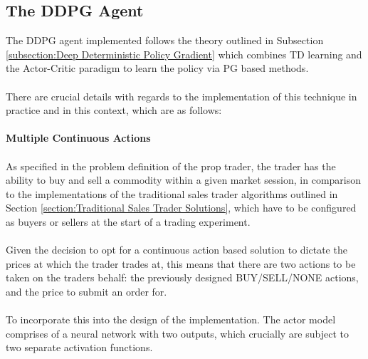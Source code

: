 \documentclass[ %
                    author={Ashwinder Khurana},
                supervisor={Prof Dave Cliff},
                    degree={MEng},
                     title={The Deeply Reinforced Trader},
                  subtitle={},
                      type={enterprise},
                      year={2020} ]{dissertation}
\begin{document}
{\subsection{The DDPG Agent}
The DDPG agent implemented follows the theory outlined in Subsection \ref{subsection:Deep Deterministic Policy Gradient} which combines TD learning and the Actor-Critic paradigm to learn the policy via PG based methods. 
\\
\\
\noindent
There are crucial details with regards to the implementation of this technique in practice and in this context, which are as follows:
\\
\\
\textbf{Multiple Continuous Actions}
\\
\\
\noindent
As specified in the problem definition of the prop trader, the trader has the ability to buy and sell a commodity within a given market session, in comparison to the implementations of the traditional sales trader algorithms outlined in Section \ref{section:Traditional Sales Trader Solutions}, which have to be configured as buyers or sellers at the start of a trading experiment. 
\\
\\
Given the decision to opt for a continuous action based solution to dictate the prices at which the trader trades at, this means that there are two actions to be taken on the traders behalf: the previously designed BUY/SELL/NONE actions, and the price to submit an order for. 
\\
\\
To incorporate this into the design of the implementation. The actor model comprises of a neural network with two outputs, which crucially are subject to two separate activation functions. 

}
\end{document}

